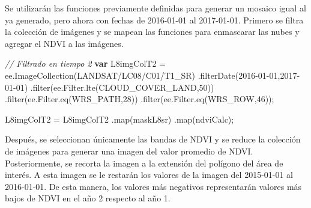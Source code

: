 \documentclass[
  12pt,
  letterpaper,
  twoside]{book}
\newenvironment{Shaded}{\begin{snugshade}}{\end{snugshade}}
\newcommand{\AttributeTok}[1]{\textcolor[rgb]{0.48,0.12,0.64}{#1}}
\newcommand{\CommentTok}[1]{\textcolor[rgb]{0.24,0.58,0.00}{\textit{#1}}}
\newcommand{\DecValTok}[1]{\textcolor[rgb]{0.28,0.53,0.93}{#1}}
\newcommand{\FunctionTok}[1]{\textcolor[rgb]{0.48,0.12,0.64}{#1}}
\newcommand{\KeywordTok}[1]{\textcolor[rgb]{0.00,0.00,0.00}{\textbf{#1}}}
\newcommand{\NormalTok}[1]{#1}
\newcommand{\OperatorTok}[1]{\textcolor[rgb]{0.00,0.00,0.00}{#1}}
\newcommand{\StringTok}[1]{\textcolor[rgb]{0.87,0.29,0.22}{#1}}
\begin{document}
Se utilizarán las funciones previamente definidas para generar un mosaico igual al ya generado, pero ahora con fechas de 2016-01-01 al 2017-01-01. Primero se filtra la colección de imágenes y se mapean las funciones para enmascarar las nubes y agregar el NDVI a las imágenes.

\begin{Shaded}
\begin{Highlighting}[]
\CommentTok{// Filtrado en tiempo 2}
\KeywordTok{var}\NormalTok{ L8imgColT2 }\OperatorTok{=}\NormalTok{ ee}\OperatorTok{.}\FunctionTok{ImageCollection}\NormalTok{(}\StringTok{\textquotesingle{}LANDSAT/LC08/C01/T1\_SR\textquotesingle{}}\NormalTok{)}
  \OperatorTok{.}\FunctionTok{filterDate}\NormalTok{(}\StringTok{\textquotesingle{}2016{-}01{-}01\textquotesingle{}}\OperatorTok{,}\StringTok{\textquotesingle{}2017{-}01{-}01\textquotesingle{}}\NormalTok{)}
  \OperatorTok{.}\FunctionTok{filter}\NormalTok{(ee}\OperatorTok{.}\AttributeTok{Filter}\OperatorTok{.}\FunctionTok{lte}\NormalTok{(}\StringTok{\textquotesingle{}CLOUD\_COVER\_LAND\textquotesingle{}}\OperatorTok{,}\DecValTok{50}\NormalTok{))}
  \OperatorTok{.}\FunctionTok{filter}\NormalTok{(ee}\OperatorTok{.}\AttributeTok{Filter}\OperatorTok{.}\FunctionTok{eq}\NormalTok{(}\StringTok{\textquotesingle{}WRS\_PATH\textquotesingle{}}\OperatorTok{,}\DecValTok{28}\NormalTok{))}
  \OperatorTok{.}\FunctionTok{filter}\NormalTok{(ee}\OperatorTok{.}\AttributeTok{Filter}\OperatorTok{.}\FunctionTok{eq}\NormalTok{(}\StringTok{\textquotesingle{}WRS\_ROW\textquotesingle{}}\OperatorTok{,}\DecValTok{46}\NormalTok{))}\OperatorTok{;}

\NormalTok{L8imgColT2 }\OperatorTok{=}\NormalTok{ L8imgColT2}
  \OperatorTok{.}\FunctionTok{map}\NormalTok{(maskL8sr)}
  \OperatorTok{.}\FunctionTok{map}\NormalTok{(ndviCalc)}\OperatorTok{;}
\end{Highlighting}
\end{Shaded}

Después, se seleccionan únicamente las bandas de NDVI y se reduce la colección de imágenes para generar una imagen del valor promedio de NDVI. Posteriormente, se recorta la imagen a la extensión del polígono del área de interés. A esta imagen se le restarán los valores de la imagen del 2015-01-01 al 2016-01-01. De esta manera, los valores más negativos representarán valores más bajos de NDVI en el año 2 respecto al año 1.
\end{document}
